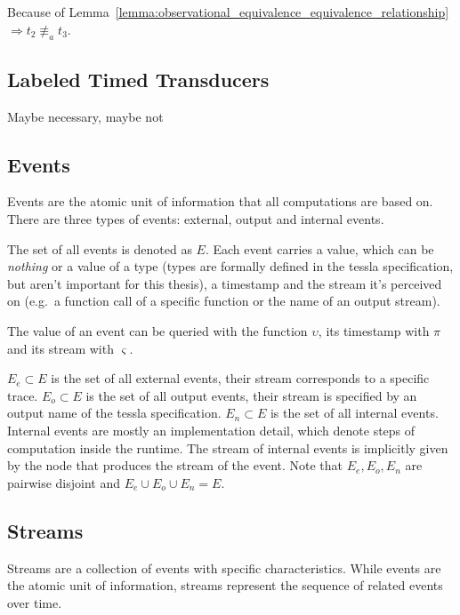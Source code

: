 \begin{exmp}[name=Observational Equivalence]
  Because of Lemma~\ref{lemma:observational_equivalence_equivalence_relationship} \(\Rightarrow t_2 \not\equiv_a t_3\).

\end{exmp}

\subsection{Labeled Timed Transducers}
Maybe necessary, maybe not

\subsection{Events}
\label{sec:concepts:defs:events}

Events are the atomic unit of information that all computations are based on.
There are three types of events: external, output and internal events.

The set of all events is denoted as \(E\).
Each event carries a value, which can be \emph{nothing} or a value of a type (types are formally defined in the \gls{tessla} specification, but aren't important for this thesis), a timestamp and the stream it's perceived on (e.g.\ a function call of a specific function or the name of an output stream).

The value of an event can be queried with the function \(\upsilon\), its timestamp with \(\pi\) and its stream with \(\varsigma\).

\(E_e \subset E\) is the set of all external events, their stream corresponds to a specific trace.
\(E_o \subset E\) is the set of all output events, their stream is specified by an output name of the \gls{tessla} specification.
\(E_n \subset E\) is the set of all internal events.
Internal events are mostly an implementation detail, which denote steps of computation inside the runtime.
The stream of internal events is implicitly given by the node that produces the stream of the event.
Note that \(E_e, E_o, E_n\) are pairwise disjoint and \(E_e \cup E_o \cup E_n = E\).

\subsection{Streams}
\label{sec:concepts:defs:streams}

Streams are a collection of events with specific characteristics.
While events are the atomic unit of information, streams represent the sequence of related events over time.

